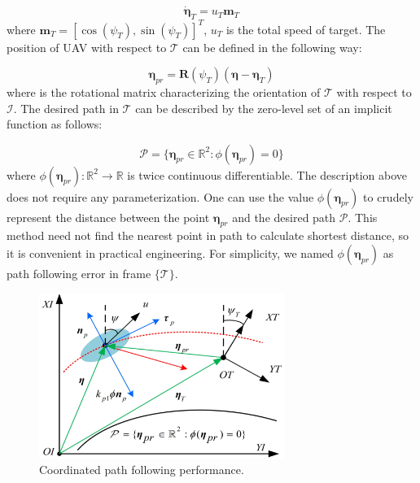 \documentclass[a4paper, 10pt, conference]{ieeeconf}      %
\begin{document}
\begin{equation}\label{eq4}
	\dot{\bm{\eta}}_T=u_T\bm{m}_T
\end{equation}
where $\bm{m}_T=[\cos(\psi_T),\sin(\psi_T)]^T$, $u_T$ is the total speed of target. The position of UAV with respect to $\mathcal{T}$ can be defined in the following way:

\begin{equation}\label{eq5}
	\bm{\eta}_{pr}=\bm{R}(\psi_T)(\bm{\eta}-\bm{\eta}_T)
\end{equation}
where  is the rotational matrix characterizing the orientation of $\mathcal{T}$ with respect to $\mathcal{I}$. The desired path in $\mathcal{T}$ can be described by the zero-level set of an implicit function as follows:

\begin{equation}\label{eq6}
	\mathcal{P}=\{\bm{\eta}_{pr}\in \mathbb{R}^2:\phi(\bm{\eta}_{pr})=0\}
\end{equation}
where $\phi(\bm{\eta}_{pr}):\mathbb{R}^2\rightarrow \mathbb{R}$ is twice continuous differentiable. The description above does not require any parameterization. One can use the value $\phi(\bm{\eta}_{pr})$ to crudely represent the distance between the point $\bm{\eta}_{pr}$ and the desired path $\mathcal{P}$. This method need not find the nearest point in path to calculate shortest distance, so it is convenient in practical engineering. For simplicity, we named $\phi(\bm{\eta}_{pr})$ as path following error in frame $\{\mathcal{T}\}$. 

\begin{figure}[!htb]
	\centering
	\includegraphics[width=8cm]{fig1.eps}
	\caption{Coordinated path following performance.}
	\label{fig1}
\end{figure}
\end{document}
